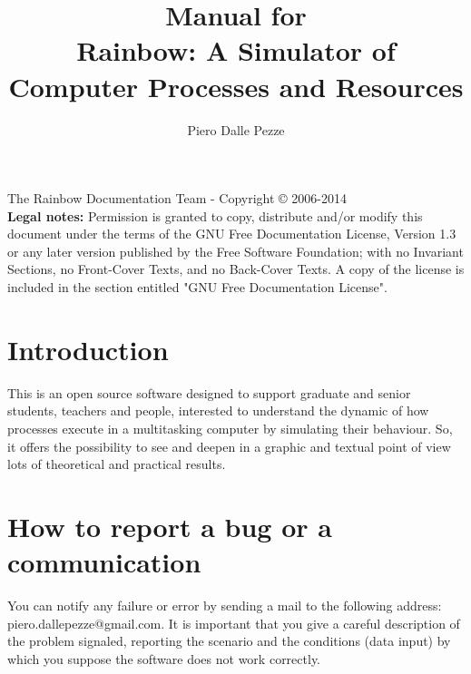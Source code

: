 \documentclass[10pt,a4paper,twoside,titlepage]{article}
\begin{document}
\begin{titlepage}
  \title{Manual for\\ Rainbow: A Simulator of Computer Processes and Resources}
  \author{Piero Dalle Pezze}    
\end{titlepage}

\maketitle


\newpage
The Rainbow Documentation Team - Copyright © 2006-2014 \\
\textbf{Legal notes:} Permission is granted to copy, distribute and/or modify this document under the terms of the GNU Free Documentation License, Version 1.3 or any later version published by the Free Software Foundation; with no Invariant Sections, no Front-Cover Texts, and no Back-Cover Texts. A copy of the license is included in the section entitled "GNU Free Documentation License".
\newpage



\tableofcontents
\listoffigures
\listoftables


\newpage



\section{Introduction}
\label{sec:introduction}
This is an open source software designed to support graduate and senior students, teachers and people, interested to understand the dynamic of how processes execute in a multitasking computer by simulating their behaviour. So, it offers the possibility to see and deepen in a graphic and textual point of view lots of theoretical and practical results. 



\section{How to report a bug or a communication}
\label{sec:how_to_report_a_bug_or_a_communication}
You can notify any failure or error by sending a mail to the following address: piero.dallepezze@gmail.com. It is important that you give a careful description of the problem signaled, reporting the scenario and the conditions (data input) by which you suppose the software does not work correctly.
\end{document}
